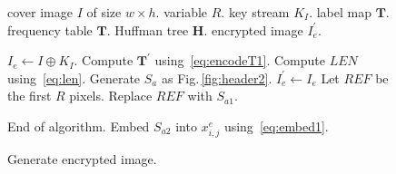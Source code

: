 \documentclass{elsarticle}
\begin{document}
	\begin{figure}[!t]
		\begin{algorithm}[H]
			\caption{Generate encrypted image.}
			\label{algo:embed1}
			
			\begin{algorithmic}[1]
				\Require cover image \(I\) of size \(w \times h\).
				\Require variable \(R\).
				\Require key stream \(K_I\).
				\Require label map \(\mathbf{T}\).
				\Require frequency table \(\mathbf{T}\).
				\Require Huffman tree \(\mathbf{H}\).
				\Ensure encrypted image \(I_e^\prime\).
				
				\State \(I_e \gets I \oplus K_I\).
				\State Compute \(\mathbf{T^\prime}\) using~\eqref{eq:encodeT1}.
				\State Compute \(LEN\) using~\eqref{eq:len}.
				\State Generate \(S_a\) as Fig.\,\ref{fig:header2}.
				\State \(I_e^\prime \gets I_e\)
				\State Let \(REF\) be the first \(R\) pixels.
				\State Replace \(REF\) with \(S_{a1}\).
				
				\State			End of algorithm.
				\Else
				\State			Embed \(S_{a2}\) into \(x^e_{i, j}\) using~\eqref{eq:embed1}.
				\EndIf
				\EndFor
			\end{algorithmic}
		\end{algorithm}
	\end{figure}
	
\end{document}
